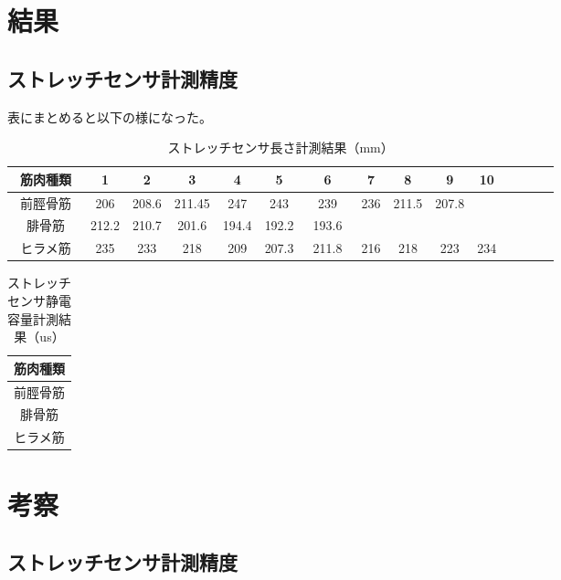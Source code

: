 \section{結果}
\subsection{ストレッチセンサ計測精度}
表にまとめると以下の様になった。
\begin{table}[htb]
    \caption{ストレッチセンサ長さ計測結果（mm）}
    \begin{tabular}{|c|c|c|c|c|c|c|c|c|c|c|c|c|c|c|}\hline
        筋肉種類 & 1 & 2 & 3 & 4 & 5 & 6 & 7 & 8 & 9 & 10\\ \hline
        前脛骨筋　& 206 & 208.6 & 211.45 & 247 & 243 & 239 & 236 & 211.5 & 207.8 \\ \hline
        腓骨筋 & 212.2 & 210.7 & 201.6 & 194.4 & 192.2 & 193.6　&\\ \hline
        ヒラメ筋 & 235 & 233 & 218 & 209 & 207.3 & 211.8 & 216 & 218 & 223 & 234 \\ \hline
    \end{tabular}
\end{table}
\begin{table}[htb]
    \caption{ストレッチセンサ静電容量計測結果（us）}
    \begin{tabular}{|c|}\hline
        筋肉種類 \\ \hline
        前脛骨筋 \\ \hline
        腓骨筋 \\ \hline
        ヒラメ筋 \\ \hline
    \end{tabular}
\end{table}
\section{考察}
\subsection{ストレッチセンサ計測精度}